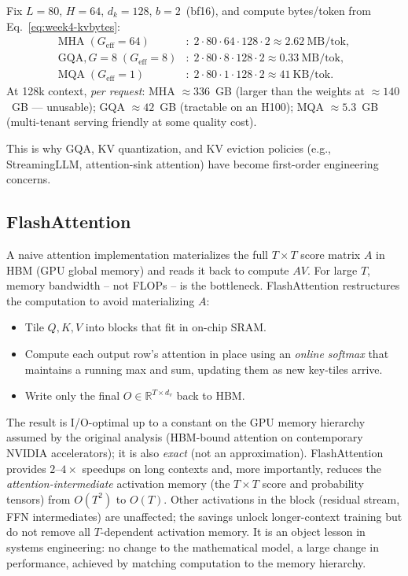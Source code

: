 \begin{workedexample}
Fix $L=80$, $H=64$, $d_k=128$, $b=2$~(bf16), and compute
bytes/token from Eq.~\eqref{eq:week4-kvbytes}:
\begin{align*}
\text{MHA} \; (G_{\mathrm{eff}}=64) &:
  \;2 \cdot 80 \cdot 64 \cdot 128 \cdot 2 \approx 2.62~\text{MB/tok},\\
\text{GQA}, G=8 \; (G_{\mathrm{eff}}=8) &:
  \;2 \cdot 80 \cdot 8 \cdot 128 \cdot 2 \approx 0.33~\text{MB/tok},\\
\text{MQA} \; (G_{\mathrm{eff}}=1) &:
  \;2 \cdot 80 \cdot 1 \cdot 128 \cdot 2 \approx 41~\text{KB/tok}.
\end{align*}
At 128k context, \emph{per request}: MHA $\approx 336$~GB (larger
than the weights at $\approx 140$~GB --- unusable); GQA $\approx
42$~GB (tractable on an H100); MQA $\approx 5.3$~GB (multi-tenant
serving friendly at some quality cost).
\end{workedexample}

This is why GQA, KV quantization, and KV eviction policies
(e.g., StreamingLLM, attention-sink attention) have become
first-order engineering concerns.

\subsection{FlashAttention}

A naive attention implementation materializes the full
$T \times T$ score matrix $A$ in HBM (GPU global memory) and reads it
back to compute $AV$. For large $T$, memory bandwidth -- not FLOPs --
is the bottleneck. FlashAttention \citep{dao2022flashattention,
dao2023flashattention2} restructures the computation to avoid
materializing $A$:
\begin{itemize}
  \item Tile $Q, K, V$ into blocks that fit in on-chip SRAM.
  \item Compute each output row's attention in place using an
        \emph{online softmax} that maintains a running max and sum,
        updating them as new key-tiles arrive.
  \item Write only the final $O \in \mathbb{R}^{T \times d_v}$ back
        to HBM.
\end{itemize}
The result is I/O-optimal up to a constant on the GPU memory
hierarchy assumed by the original analysis (HBM-bound attention
on contemporary NVIDIA accelerators); it is also \emph{exact} (not
an approximation). FlashAttention provides $2\text{--}4\times$
speedups on long contexts and, more importantly, reduces the
\emph{attention-intermediate} activation memory (the $T \times T$
score and probability tensors) from $O(T^2)$ to $O(T)$. Other
activations in the block (residual stream, FFN intermediates) are
unaffected; the savings unlock longer-context training but do not
remove all $T$-dependent activation memory. It is an object lesson in systems
engineering: no change to the mathematical model, a large change in
performance, achieved by matching computation to the memory
hierarchy.

